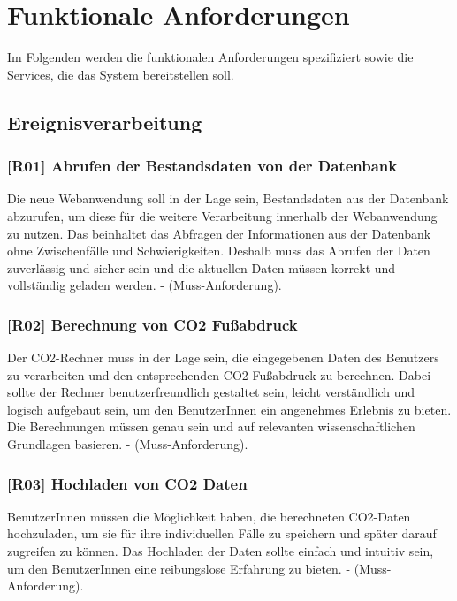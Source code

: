 \section{Funktionale Anforderungen}
\label{chapter:3-section:funktionale-anforderungen}

Im Folgenden werden die funktionalen Anforderungen spezifiziert sowie die Services, die das System bereitstellen soll.

\subsection{Ereignisverarbeitung}

\subsubsection{[R01] Abrufen der Bestandsdaten von der Datenbank}

Die neue Webanwendung soll in der Lage sein, Bestandsdaten aus der Datenbank abzurufen, um diese für die weitere Verarbeitung innerhalb der Webanwendung zu nutzen.
Das beinhaltet das Abfragen der Informationen aus der Datenbank ohne Zwischenfälle und Schwierigkeiten.
Deshalb muss das Abrufen der Daten zuverlässig und sicher sein und die aktuellen Daten müssen korrekt und vollständig geladen werden. - (Muss-Anforderung).

\subsubsection{[R02] Berechnung von CO2 Fußabdruck}

Der CO2-Rechner muss in der Lage sein, die eingegebenen Daten des Benutzers zu verarbeiten und den entsprechenden CO2-Fußabdruck zu berechnen. Dabei sollte der Rechner benutzerfreundlich gestaltet sein, leicht verständlich und logisch aufgebaut sein, um den BenutzerInnen  ein angenehmes Erlebnis zu bieten. Die Berechnungen müssen genau sein und auf relevanten wissenschaftlichen Grundlagen basieren. - (Muss-Anforderung).

\subsubsection{[R03] Hochladen von CO2 Daten}

BenutzerInnen  müssen die Möglichkeit haben, die berechneten CO2-Daten hochzuladen, um sie für ihre individuellen Fälle zu speichern und später darauf zugreifen zu können. Das Hochladen der Daten sollte einfach und intuitiv sein, um den BenutzerInnen  eine reibungslose Erfahrung zu bieten. - (Muss-Anforderung).

